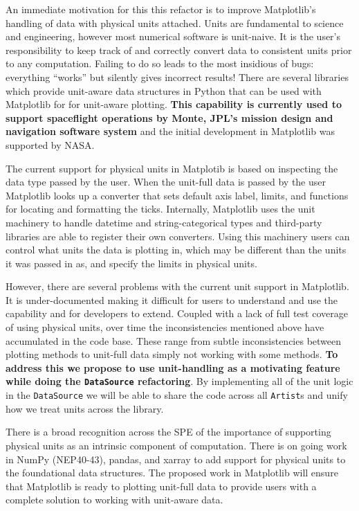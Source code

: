 \documentclass[12pt]{article}
\numberwithin{page}{section}
\begin{document}
An immediate motivation for this this refactor is to improve
Matplotlib's handling of data with physical units attached.  Units are
fundamental to science and engineering, however most numerical
software is unit-naive.  It is the user's responsibility to keep track
of and correctly convert data to consistent units prior to any
computation.  Failing to do so leads to the most insidious of bugs:
everything ``works'' but silently gives incorrect results!  There are
several libraries which provide unit-aware data structures in Python
that can be used with Matplotlib for for unit-aware plotting.
\textbf{This capability is currently used to support spaceflight
  operations by Monte, JPL's mission design and navigation software
  system} and the initial development in Matplotlib was supported by
NASA.




The current support for physical units in Matplotib is based on
inspecting the data type passed by the user.  When the unit-full data
is passed by the user Matplotlib looks up a converter that sets
default axis label, limits, and functions for locating and formatting
the ticks.  Internally, Matplotlib uses the unit machinery to handle
datetime and string-categorical types and third-party libraries are
able to register their own converters.  Using this machinery users can
control what units the data is plotting in, which may be different
than the units it was passed in as, and specify the limits in physical
units.

However, there are several problems with the current unit support in
Matplotlib.  It is under-documented making it difficult for users to
understand and use the capability and for developers to extend.
Coupled with a lack of full test coverage of using physical units,
over time the inconsistencies mentioned above have accumulated in the
code base.  These range from subtle inconsistencies between plotting
methods to unit-full data simply not working with some methods.
\textbf{To address this we propose to use unit-handling as a
  motivating feature while doing the \texttt{DataSource} refactoring}.
By implementing all of the unit logic in the \texttt{DataSource} we
will be able to share the code across all \texttt{Artist}s and unify
how we treat units across the library.


There is a broad recognition across the SPE of the importance of
supporting physical units as an intrinsic component of computation.
There is on going work in NumPy (NEP40-43), pandas, and xarray to add
support for physical units to the foundational data structures.  The
proposed work in Matplotlib will ensure that Matplotlib is ready to
plotting unit-full data to provide users with a complete solution to
working with unit-aware data.
\end{document}
